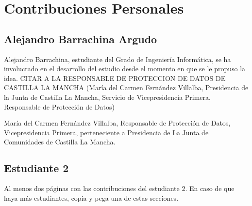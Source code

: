 \chapter*{Contribuciones Personales}
\label{cap:contribucionesPersonales}

\section*{Alejandro Barrachina Argudo}
Alejandro Barrachina, estudiante del Grado de Ingeniería Informática, se ha involucrado en el desarrollo del estudio desde el momento en que se le propuso la idea.
CITAR A LA RESPONSABLE DE PROTECCION DE DATOS DE CASTILLA LA MANCHA (María del Carmen Fernández Villalba, Presidencia de la Junta de Castilla La Mancha, Servicio de Vicepresidencia Primera, Responsable de Protección de Datos)

María del Carmen Fernández Villalba, Responsable de Protección de Datos, Vicepresidencia Primera, perteneciente a Presidencia de La Junta de Comunidades de Castilla La Mancha.

\section*{Estudiante 2}
Al menos dos páginas con las contribuciones del estudiante 2. En caso de que haya más estudiantes, copia y pega una de estas secciones.

